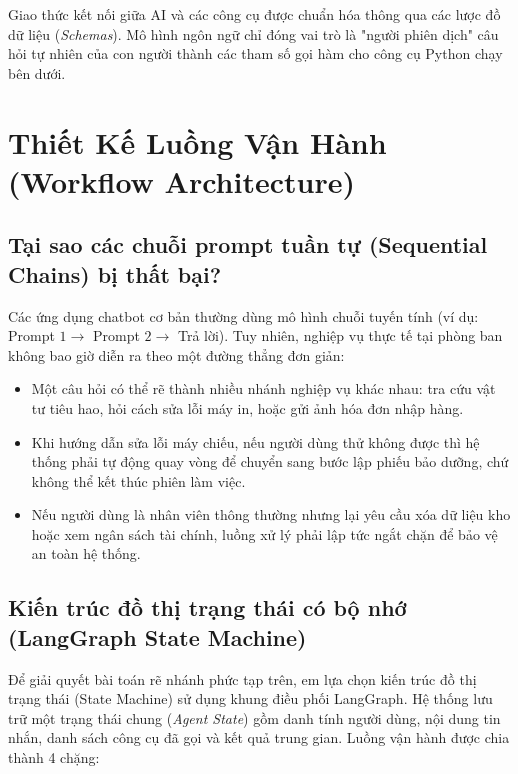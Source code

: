 \documentclass[11pt,a4paper]{article}
\begin{document}
Giao thức kết nối giữa AI và các công cụ được chuẩn hóa thông qua các lược đồ dữ liệu (\textit{Schemas}). Mô hình ngôn ngữ chỉ đóng vai trò là "người phiên dịch" câu hỏi tự nhiên của con người thành các tham số gọi hàm cho công cụ Python chạy bên dưới.

\vspace{0.3cm}

\section{Thiết Kế Luồng Vận Hành (Workflow Architecture)}

\subsection{Tại sao các chuỗi prompt tuần tự (Sequential Chains) bị thất bại?}
Các ứng dụng chatbot cơ bản thường dùng mô hình chuỗi tuyến tính (ví dụ: Prompt $1 \rightarrow$ Prompt $2 \rightarrow$ Trả lời). Tuy nhiên, nghiệp vụ thực tế tại phòng ban không bao giờ diễn ra theo một đường thẳng đơn giản:
\begin{itemize}
    \item Một câu hỏi có thể rẽ thành nhiều nhánh nghiệp vụ khác nhau: tra cứu vật tư tiêu hao, hỏi cách sửa lỗi máy in, hoặc gửi ảnh hóa đơn nhập hàng.
    \item Khi hướng dẫn sửa lỗi máy chiếu, nếu người dùng thử không được thì hệ thống phải tự động quay vòng để chuyển sang bước lập phiếu bảo dưỡng, chứ không thể kết thúc phiên làm việc.
    \item Nếu người dùng là nhân viên thông thường nhưng lại yêu cầu xóa dữ liệu kho hoặc xem ngân sách tài chính, luồng xử lý phải lập tức ngắt chặn để bảo vệ an toàn hệ thống.
\end{itemize}

\subsection{Kiến trúc đồ thị trạng thái có bộ nhớ (LangGraph State Machine)}
Để giải quyết bài toán rẽ nhánh phức tạp trên, em lựa chọn kiến trúc đồ thị trạng thái (State Machine) sử dụng khung điều phối LangGraph. Hệ thống lưu trữ một trạng thái chung (\textit{Agent State}) gồm danh tính người dùng, nội dung tin nhắn, danh sách công cụ đã gọi và kết quả trung gian. Luồng vận hành được chia thành 4 chặng:
\end{document}
